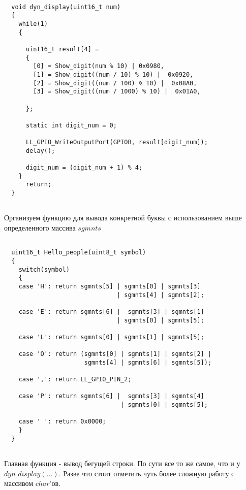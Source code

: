   \begin{verbatim}
      
  void dyn_display(uint16_t num)
  {
    while(1)
    {
    
      uint16_t result[4] = 
      {
        [0] = Show_digit(num % 10) | 0x0980,                         
        [1] = Show_digit((num / 10) % 10) |  0x0920,         
        [2] = Show_digit((num / 100) % 10) |  0x08A0,     
        [3] = Show_digit((num / 1000) % 10) |  0x01A0,        
    
      };
      
      static int digit_num = 0;
    
      LL_GPIO_WriteOutputPort(GPIOB, result[digit_num]); 
      delay();
      
      digit_num = (digit_num + 1) % 4;
    }
      return;
  }
  
  \end{verbatim}
  
  Организуем функцию для вывода конкретной буквы с использованием выше определенного массива $sgmnts$
  
  \begin{verbatim}
      
  uint16_t Hello_people(uint8_t symbol)
  {
    switch(symbol)
    {
    case 'H': return sgmnts[5] | sgmnts[0] | sgmnts[3] 
                               | sgmnts[4] | sgmnts[2];
    
    case 'E': return sgmnts[6] |  sgmnts[3] | sgmnts[1] 
                               | sgmnts[0] | sgmnts[5];
    
    case 'L': return sgmnts[0] | sgmnts[1] | sgmnts[5];
    
    case 'O': return (sgmnts[0] | sgmnts[1] | sgmnts[2] |
                      sgmnts[4] | sgmnts[6] | sgmnts[5]);
              
    case ',': return LL_GPIO_PIN_2; 
    
    case 'P': return sgmnts[6] |  sgmnts[3] | sgmnts[4] 
                                | sgmnts[0] | sgmnts[5];
    
    case ' ': return 0x0000;
    }
  }
  
  \end{verbatim}
  
  Главная функция - вывод бегущей строки. По сути все то же самое, что и у $dyn\_display(...)$. Разве что стоит отметить чуть более сложную работу с массивом $char$'ов.
  
